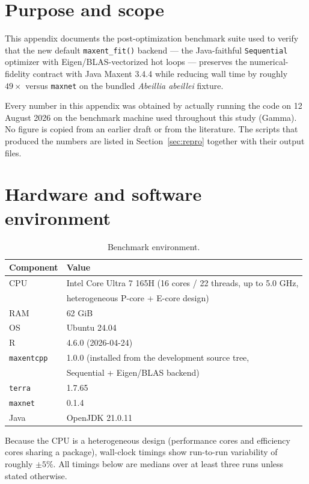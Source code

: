\section{Purpose and scope}

This appendix documents the post-optimization benchmark suite used to
verify that the new default \texttt{maxent\_fit()} backend --- the
Java-faithful \texttt{Sequential} optimizer with Eigen/BLAS-vectorized
hot loops --- preserves the numerical-fidelity contract with Java Maxent
3.4.4 while reducing wall time by roughly $49\times$ versus
\texttt{maxnet} on the bundled \emph{Abeillia abeillei} fixture.

Every number in this appendix was obtained by actually running the code
on 12 August 2026 on the benchmark machine used throughout this study
(Gamma).  No figure is copied from an earlier draft or from the
literature.  The scripts that produced the numbers are listed in
Section~\ref{sec:repro} together with their output files.

\section{Hardware and software environment}

\begin{table}[h]
\centering
\small
\begin{tabular}{ll}
\toprule
\textbf{Component} & \textbf{Value} \\
\midrule
CPU & Intel Core Ultra 7 165H (16 cores / 22 threads, up to 5.0 GHz, \\
   & heterogeneous P-core + E-core design) \\
RAM & 62 GiB \\
OS & Ubuntu 24.04 \\
R & 4.6.0 (2026-04-24) \\
\texttt{maxentcpp} & 1.0.0 (installed from the development source tree, \\
   & Sequential + Eigen/BLAS backend) \\
\texttt{terra} & 1.7.65 \\
\texttt{maxnet} & 0.1.4 \\
Java & OpenJDK 21.0.11 \\
\bottomrule
\end{tabular}
\caption{Benchmark environment.}
\label{tab:env}
\end{table}

Because the CPU is a heterogeneous design (performance cores and
efficiency cores sharing a package), wall-clock timings show run-to-run
variability of roughly $\pm 5\%$.  All timings below are medians over
at least three runs unless stated otherwise.

